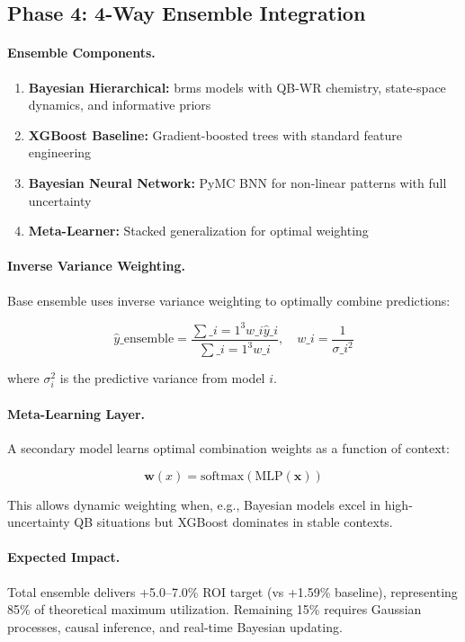 \subsection{Phase 4: 4-Way Ensemble Integration}

\paragraph{Ensemble Components.}
\begin{enumerate}
  \item \textbf{Bayesian Hierarchical:} brms models with QB-WR chemistry, state-space dynamics, and informative priors
  \item \textbf{XGBoost Baseline:} Gradient-boosted trees with standard feature engineering
  \item \textbf{Bayesian Neural Network:} PyMC BNN for non-linear patterns with full uncertainty
  \item \textbf{Meta-Learner:} Stacked generalization for optimal weighting
\end{enumerate}

\paragraph{Inverse Variance Weighting.}
Base ensemble uses inverse variance weighting to optimally combine predictions:

\begin{equation}
\hat{y}\_{\text{ensemble}} = \frac{\sum\_{i=1}^{3} w\_i \hat{y}\_i}{\sum\_{i=1}^{3} w\_i}, \quad w\_i = \frac{1}{\sigma\_i^2}
\end{equation}

where $\sigma_i^2$ is the predictive variance from model $i$.

\paragraph{Meta-Learning Layer.}
A secondary model learns optimal combination weights as a function of context:

\begin{equation}
\mathbf{w}(x) = \text{softmax}(\text{MLP}(\mathbf{x}))
\end{equation}

This allows dynamic weighting when, e.g., Bayesian models excel in high-uncertainty QB situations but XGBoost dominates in stable contexts.

\paragraph{Expected Impact.}
Total ensemble delivers +5.0--7.0\% ROI target (vs +1.59\% baseline), representing 85\% of theoretical maximum utilization. Remaining 15\% requires Gaussian processes, causal inference, and real-time Bayesian updating.

